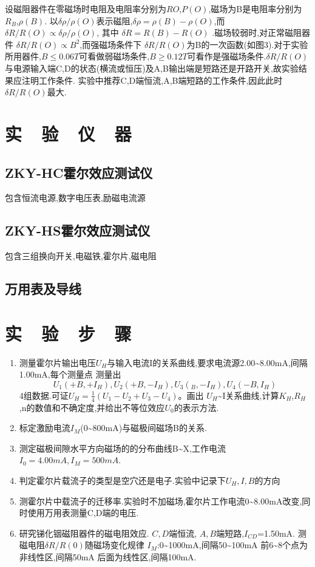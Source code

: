 \documentclass{thuemp}
\begin{document}
设磁阻器件在零磁场时电阻及电阻率分别为$R{O}$,$P(O)$,磁场为B是电阻率分别为$R_{B}$,$\rho(B)$.
以$ \delta \rho/\rho(O) $表示磁阻,$ \delta \rho = \rho (B) - \rho(O) $,而$\delta R /R(O) \propto \delta \rho /\rho(O)$,
其中
$ \delta R = R(B)-R(O) $
.磁场较弱时,对正常磁阻器件
$\delta R /R(O)\propto B^{2}$,而强磁场条件下
$ \delta R /R(O)$为B的一次函数(如图3).对于实验所用器件,$ B \leq 0.06T$可看做弱磁场条件,$B\geq 0.12T$可看作是强磁场条件.$\delta R / R(O)$与电源输入端C,D的状态(横流或恒压)及A,B输出端是短路还是开路开关,故实验结果应注明工作条件.
实验中推荐C,D端恒流,A,B端短路的工作条件,因此此时$\delta R/R(O)$最大.
\section{实~~验~~仪~~器}
\subsection{ZKY-HC霍尔效应测试仪}
包含恒流电源,数字电压表,励磁电流源
\subsection{ZKY-HS霍尔效应测试仪}
包含三组换向开关,电磁铁,霍尔片,磁电阻
\subsection{万用表及导线}
\section{实~~验~~步~~骤} 
\begin{enumerate}
	\item 测量霍尔片输出电压$U_{H}$与输入电流I的关系曲线,要求电流源2.00\~{}8.00mA,间隔1.00mA,每个测量点
	测量出$$U_{1}(+B,+I_H{}),U_{2}(+B,-I_{H}),U_{3}(_B,-I_{H}),U_{4}(-B,I_{H})$$
	4组数据.可证$U_{H}=\frac{1}{4}(U_{1}-U_{2}+U_{3}-U_{4})$。画出
	$U_{H}$\~{}I关系曲线,计算$K_{H}$,$R_{H}$,n的数值和不确定度,并给出不等位效应$U_{0}$的表示方法.
	\item 标定激励电流$I_{M}$(0\~{}800mA)与磁极间磁场B的关系.
	\item 测定磁极间隙水平方向磁场的的分布曲线B\~{}X,工作电流$ I_{0}=4.00mA,I_{M}=500mA $.
	\item 判定霍尔片载流子的类型是空穴还是电子.实验中记录下$ U_{H},I,B $的方向
	\item 测霍尔片中载流子的迁移率.实验时不加磁场,霍尔片工作电流0\~{}8.00mA改变,同时使用万用表测量C,D端的电压.
	\item 研究锑化铟磁阻器件的磁电阻效应. $C,D$端恒流, $A,B$端短路,$ I_{CD} $=1.50mA.
	\subitem 测磁电阻$ \delta R/R(0) $随磁场变化规律
	\subitem $ I_{M} $:0\~{}1000mA,间隔50\~{}100mA
	\subitem 前6\~{}8个点为非线性区,间隔50mA
	\subitem 后面为线性区,间隔100mA.
\end{enumerate}
\end{document}
